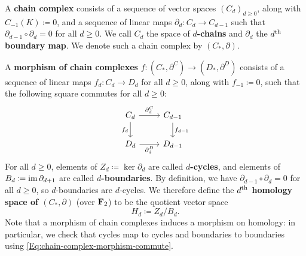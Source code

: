 \begin{definition}
  A \textbf{chain complex} consists of a sequence of vector spaces $(C_d)_{d \geq 0}$, along with $C_{-1}(K) \coloneq 0$, and a sequence of linear maps $\partial_d \colon C_d \to C_{d - 1}$ such that $\partial_{d - 1} \circ \partial_d = 0$ for all $d \geq 0$. We call $C_d$ the space of \textbf{$d$-chains} and $\partial_d$ the \textbf{$d^{\th}$ boundary map}. We denote such a chain complex by $(C_*, \partial)$.
  
  A \textbf{morphism of chain complexes} $f \colon (C_*, \partial^C) \to (D_*, \partial^D)$ consists of a sequence of linear maps $f_d \colon C_d \to D_d$ for all $d \geq 0$, along with $f_{-1} \coloneq 0$, such that the following square commutes for all $d \geq 0$:
  \begin{equation}
  \label{Eq:chain-complex-morphism-commute}
    \begin{tikzcd}
        C_d
          \arrow[r, "\partial^C_d"]
          \arrow[d, "f_d" swap]
        & C_{d - 1}
          \arrow[d, "f_{d - 1}"]
        \\
        D_d
          \arrow[r, "\partial^D_d" swap]
        & D_{d - 1}
    \end{tikzcd}
  \end{equation}
  For all $d \geq 0$, elements of $Z_d \coloneq \ker \partial_d$ are called \textbf{$d$-cycles}, and elements of $B_d \coloneq \im \partial_{d + 1}$ are called \textbf{$d$-boundaries}.
  By definition, we have $\partial_{d - 1} \circ \partial_d = 0$ for all $d \geq 0$, so $d$-boundaries are $d$-cycles. We therefore define the \textbf{$d^{\th}$ homology space of $(C_*, \partial)$} (over $\bf{F}_2$) to be the quotient vector space
  \[
    H_d \coloneq Z_d / B_d.
  \]
  Note that a morphism of chain complexes induces a morphism on homology: in particular, we check that cycles map to cycles and boundaries to boundaries using \eqref{Eq:chain-complex-morphism-commute}.
\end{definition}

